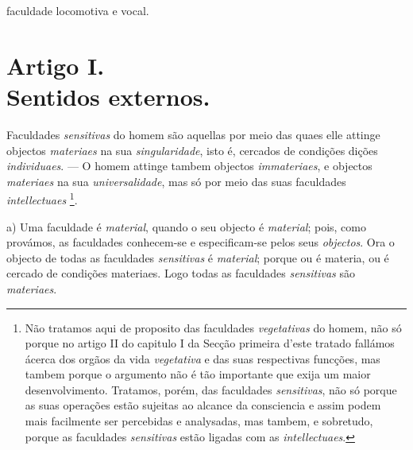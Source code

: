 faculdade locomotiva e vocal.


\section*{Artigo I.\\ Sentidos externos.}


Faculdades \emph{sensitivas} do homem são aquellas por meio das quaes elle attinge objectos \emph{materiaes} na sua \emph{singularidade}, isto é, cercados de condições  dições \emph{individuaes}. --- O homem attinge tambem objectos \emph{immateriaes}, e objectos \emph{materiaes} na sua \emph{universalidade}, mas só por meio das suas faculdades \emph{intellectuaes} \footnote{Não tratamos aqui de proposito das faculdades \emph{vegetativas} do homem, não só porque no artigo II do capitulo I da Secção primeira d'este tratado fallámos ácerca dos orgãos da vida \emph{vegetativa} e das suas respectivas funcções, mas tambem porque o argumento não é tão importante que exija um maior desenvolvimento. Tratamos, porém, das faculdades \emph{sensitivas}, não só porque as suas operações estão sujeitas ao alcance da consciencia e assim podem mais facilmente ser percebidas e analysadas, mas tambem, e sobretudo, porque as faculdades \emph{sensitivas} estão ligadas com as \emph{intellectuaes}.}.



a) Uma faculdade é \emph{material}, quando o seu objecto é \emph{material}; pois, como provámos, as faculdades conhecem-se e especificam-se pelos seus \emph{objectos}. Ora o objecto de todas as faculdades \emph{sensitivas} é \emph{material}; porque ou é materia, ou é cercado de condições materiaes. Logo todas as faculdades \emph{sensitivas} são \emph{materiaes}.

